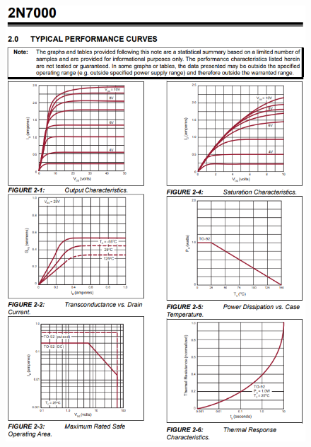 \begin{figure}[h]
    \centering
    \includegraphics[width=0.9\linewidth]{Appendices/2N7000_3.png}
    \label{2N7000_3}
\end{figure}
